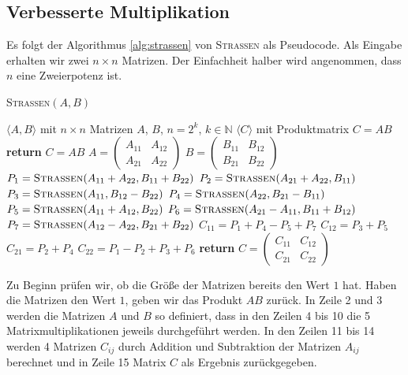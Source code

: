 \documentclass[oneside]{scrbook}
\numberwithin{equation}{section}
\begin{document}
\subsection{Verbesserte Multiplikation}
Es folgt der Algorithmus \ref{alg:strassen} von \textsc{Strassen}  als Pseudocode. Als Eingabe erhalten wir zwei $n \times n$ Matrizen. Der Einfachheit halber wird angenommen, dass $n$ eine Zweierpotenz ist.
\begin{algorithm}
	\caption{\textsc{Strassen}$(A, B)$}
	\label{alg:strassen}
	\begin{algorithmic}[1]
		\Require $\langle A, B \rangle$ mit $n \times n$ Matrizen $A$, $B$, $n = 2^k$, $k \in \mathbb{N}$
		\Ensure $\langle C \rangle$ mit Produktmatrix $C = AB$
		 \textbf{return} $C = AB$
		\EndIf
		\State $A = \begin{pmatrix} A_{11} & A_{12} \\ A_{21} & A_{22} \end{pmatrix}$
		\State $B = \begin{pmatrix} B_{11} & B_{12} \\ B_{21} & B_{22} \end{pmatrix}$
		\State $P_1 = \textsc{Strassen}(A_{11} + A_{22}, B_{11} + B_{22})$
		\State $P_2 = \textsc{Strassen}(A_{21} + A_{22}, B_{11})$
		\State $P_3 = \textsc{Strassen}(A_{11}, B_{12} - B_{22})$
		\State $P_4 = \textsc{Strassen}(A_{22}, B_{21} - B_{11})$
		\State $P_5 = \textsc{Strassen}(A_{11} + A_{12}, B_{22})$
		\State $P_6 = \textsc{Strassen}(A_{21} - A_{11}, B_{11} + B_{12})$
		\State $P_7 = \textsc{Strassen}(A_{12} - A_{22}, B_{21} + B_{22})$
		\State $C_{11} = P_1 + P_4 - P_5 + P_7$
		\State $C_{12} = P_3 + P_5$
		\State $C_{21} = P_2 + P_4$
		\State $C_{22} = P_1 - P_2 + P_3 + P_6$
		\State \textbf{return} $C = \begin{pmatrix} C_{11} & C_{12} \\ C_{21} & C_{22} \end{pmatrix}$
	\end{algorithmic}
\end{algorithm}
Zu Beginn prüfen wir, ob die Größe der Matrizen bereits den Wert $1$ hat. Haben die Matrizen den Wert $1$, geben wir das Produkt $A B$ zurück. In Zeile 2 und 3 werden die Matrizen $A$ und $B$ so definiert, dass in den Zeilen 4 bis 10 die 5 Matrixmultiplikationen jeweils durchgeführt werden. In den Zeilen 11 bis 14 werden 4 Matrizen $C_{ij}$ durch Addition und Subtraktion der Matrizen $A_{ij}$ berechnet und in Zeile 15 Matrix $C$ als Ergebnis zurückgegeben.
\end{document}
